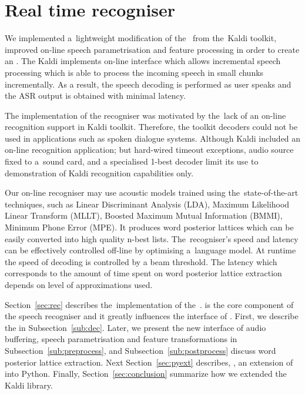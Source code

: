 \chapter{Real time recogniser}
\label{cha:decoder}

We implemented a~lightweight modification of the~ from the~Kaldi toolkit, improved on-line speech parametrisation and feature processing in order to create an .
The Kaldi  implements on-line interface which allows incremental speech processing which is able to process the incoming speech in small chunks incrementally.
As a result, the speech decoding is performed as user speaks and the ASR output is obtained with minimal latency.

The implementation of the recogniser was motivated by the~lack of an on-line recognition support in Kaldi toolkit.
Therefore, the toolkit decoders could not be used in applications such as spoken dialogue systems.
Although Kaldi included an on-line recognition application; but hard-wired timeout exceptions, audio source fixed to a~sound card, and a specialised 1-best decoder limit its use to demonstration of Kaldi recognition capabilities only.

Our on-line recogniser may use acoustic models trained using the~state-of-the-art techniques, 
such as Linear Discriminant Analysis (LDA), Maximum Likelihood Linear Transform (MLLT), Boosted Maximum Mutual Information (BMMI), Minimum Phone Error (MPE).
It produces word posterior lattices which can be easily converted into high quality n-best lists.
The~recogniser's speed and latency can be effectively controlled off-line by optimising a~language model. 
At runtime the speed of decoding is controlled by a beam threshold.
The latency which corresponds to the amount of time spent on word posterior lattice extraction depends on level of approximations used.

Section~\ref{sec:rec} describes the~implementation of the~.
 is the core component of the speech recogniser and it greatly influences the interface of .
First, we describe the  in Subsection~\ref{sub:dec}. 
Later, we present the new interface of audio buffering, speech parametrisation and feature transformations in Subsection~\ref{sub:preprocess}, and Subsection~\ref{sub:postprocess} discuss word posterior lattice extraction.
Next Section~\ref{sec:pyext} describes, , an extension of  into Python.
Finally, Section~\ref{sec:conclusion} summarize how we extended the Kaldi library.

